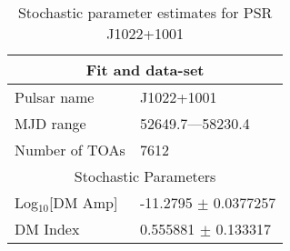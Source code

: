 \documentclass{article}
\begin{document}
\begin{table*}
\caption{Stochastic parameter estimates for PSR J1022+1001}
\begin{tabular}{ll}
\hline\hline
\multicolumn{2}{c}{Fit and data-set} \\ 
\hline
Pulsar name\dotfill & J1022+1001 \\ 
MJD range\dotfill & 52649.7---58230.4 \\ 
Number of TOAs\dotfill & 7612 \\
\hline
\multicolumn{2}{c}{Stochastic Parameters} \\ 
\hline
Log$_{10}$[DM Amp] \dotfill & -11.2795 $\pm$ 0.0377257  \\ 
DM Index \dotfill & 0.555881 $\pm$ 0.133317  \\ 
\hline
\end{tabular}
\label{Table:J1022+1001}
\end{table*} 
\end{document}
